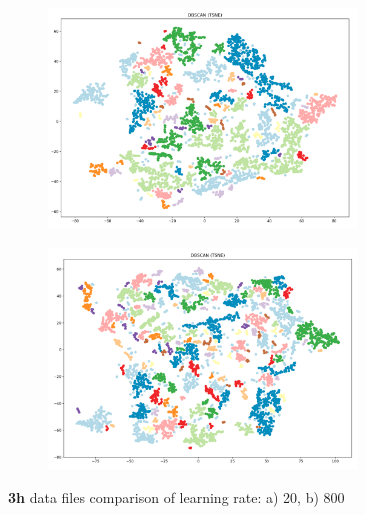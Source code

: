 \begin{figure}[H]
  \centering
  \begin{subfigure}{.5\textwidth}
    \centering
    \includegraphics[width=0.9\textwidth]{./images/tsneParametersTest/learningRate/lr203h-DBSCANCompare.png}
  \end{subfigure}%
  \begin{subfigure}{.5\textwidth}
    \centering
    \includegraphics[width=0.9\textwidth]{./images/tsneParametersTest/learningRate/lr8003h-DBSCANCompare.png}
  \end{subfigure}
	\caption{\textbf{3h} data files comparison of learning rate: a) 20, b) 800}
	\label{figure:3h-learningRateComparison20and800}
\end{figure}
